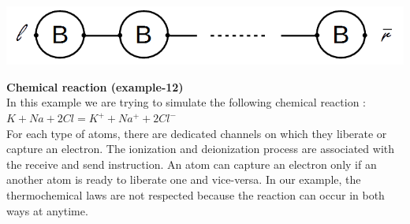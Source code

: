 \documentclass[11pt]{report}
\begin{document}
\begin{center}
\includegraphics[scale = 0.4]{Buffern.png}
\end{center}

\newpage

\tabto{0cm} {\Large \textbf{Chemical reaction (example-12)}}
\vspace*{3pt}
\\
In this example we are trying to simulate the following chemical reaction : \\
$K + Na + 2Cl = K^+ + Na^+ + 2Cl^-$ \\
For each type of atoms, there are dedicated channels on which they liberate or capture an electron. The ionization and deionization process are associated with the receive and send instruction. An atom can capture an electron only if an another atom is ready to liberate one and vice-versa. In our example, the thermochemical laws are not respected because the reaction can occur in both ways at anytime.  
\end{document}
